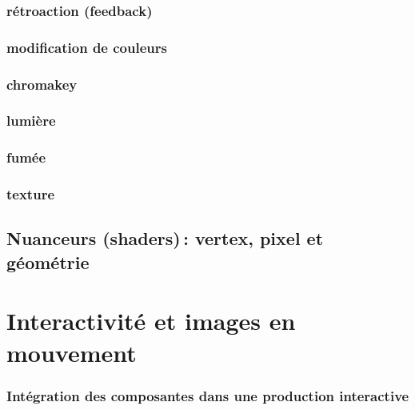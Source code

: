 \documentclass[
]{book}
\begin{document}
\hypertarget{ruxe9troaction-feedback}{%
\subsection{rétroaction (feedback)}\label{ruxe9troaction-feedback}}

\hypertarget{modification-de-couleurs}{%
\subsection{modification de couleurs}\label{modification-de-couleurs}}

\hypertarget{chromakey}{%
\subsection{chromakey}\label{chromakey}}

\hypertarget{lumiuxe8re}{%
\subsection{lumière}\label{lumiuxe8re}}

\hypertarget{fumuxe9e}{%
\subsection{fumée}\label{fumuxe9e}}

\hypertarget{texture-1}{%
\subsection{texture}\label{texture-1}}

\hypertarget{nuanceurs-shaders-vertex-pixel-et-guxe9omuxe9trie}{%
\section{Nuanceurs (shaders)\,: vertex, pixel et géométrie}\label{nuanceurs-shaders-vertex-pixel-et-guxe9omuxe9trie}}

\hypertarget{interagir}{%
\chapter{Interactivité et images en mouvement}\label{interagir}}

\hypertarget{intuxe9gration-des-composantes-dans-une-production-interactive}{%
\subsection{Intégration des composantes dans une production interactive}\label{intuxe9gration-des-composantes-dans-une-production-interactive}}
\end{document}
